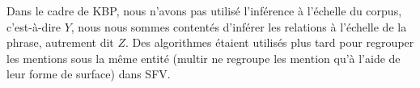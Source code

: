 \documentclass[PhD-Yoann-Dupont.tex]{subfiles}
\begin{document}
Dans le cadre de KBP, nous n'avons pas utilisé l'inférence à l'échelle du corpus, c'est-à-dire $Y$, nous nous sommes contentés d'inférer les relations à l'échelle de la phrase, autrement dit $Z$. Des algorithmes étaient utilisés plus tard pour regrouper les mentions sous la même entité (multir ne regroupe les mention qu'à l'aide de leur forme de surface) dans SFV.
\end{document}
